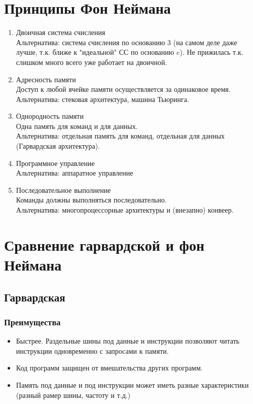 \documentclass[12pt, a4paper]{article}
\begin{document}
\section{Принципы Фон Неймана}
\begin{enumerate}
    \item Двоичная система счисления\\
    Альтернатива: система счисления по основанию 3 (на самом деле даже лучше, т.к. ближе к "идеальной" СС по основанию $e$). Не прижилась т.к. слишком много всего уже работает на двоичной.
    \item Адресность памяти\\
    Доступ к любой ячейке памяти осуществляется за одинаковое время.\\
    Альтернатива: стековая архитектура, машина Тьюринга.
    \item Однородность памяти\\
    Одна память для команд и для данных.\\
    Альтернатива: отдельная память для команд, отдельная для данных (Гарвардская архитектура).
    \item Программное управление\\
    Альтернатива: аппаратное управление
    \item Последовательное выполнение\\
    Команды должны выполняться последовательно.\\
    Альтернатива: многопроцессорные архитектуры и (внезапно) конвеер.
\end{enumerate}
\section{Сравнение гарвардской и фон Неймана}
\subsection{Гарвардская}
\subsubsection{Преимущества}
\begin{itemize}
    \item Быстрее. Раздельные шины под данные и инструкции позволяют читать инструкции одновременно с запросами к памяти.
    \item Код программ защищен от вмешательства других программ.
    \item Память под данные и под инструкции может иметь разные характеристики (разный рамер шины, частоту и т.д.)
\end{itemize}
\end{document}
